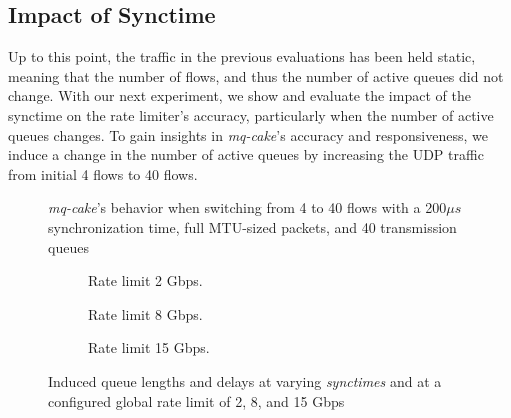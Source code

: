 \subsection{Impact of Synctime}\label{sec:synchronization-time}
Up to this point, the traffic in the previous evaluations has been held static, meaning that the number of flows, and thus the number of active queues did not change.
%
With our next experiment, we show and evaluate the impact of the synctime on the rate limiter's accuracy, particularly when the number of active queues changes.
%
To gain insights in \textit{mq-cake}'s accuracy and responsiveness, we induce a change in the number of active queues by increasing the UDP traffic from initial 4 flows to 40 flows.
%

%
\begin{figure}
    \centering
    
    \caption{\textit{mq-cake}'s behavior when switching from 4 to 40 flows with a 200$\mu s$ synchronization time, full MTU-sized packets, and 40 transmission queues}\label{fig:switching_200us}
\end{figure}
%
\begin{figure*}
    \begin{subfigure}{0.3\linewidth}
        \centering
        
        \caption{Rate limit 2 Gbps.}\label{fig:qlen_qdel_200us_2}
    \end{subfigure}
    \hfill
    \begin{subfigure}{0.3\linewidth}
        \centering
        
        \caption{Rate limit 8 Gbps.}\label{fig:qlen_qdel_200us_8}
    \end{subfigure}
    \hfill
    \begin{subfigure}{0.3\linewidth}
        \centering
        
        \caption{Rate limit 15 Gbps.}\label{fig:qlen_qdel_200us_15}
    \end{subfigure}
    \caption{Induced queue lengths and delays at varying \textit{synctimes} and at a configured global rate limit of 2, 8, and 15 Gbps}\label{fig:qlen_qdel}
\end{figure*}

